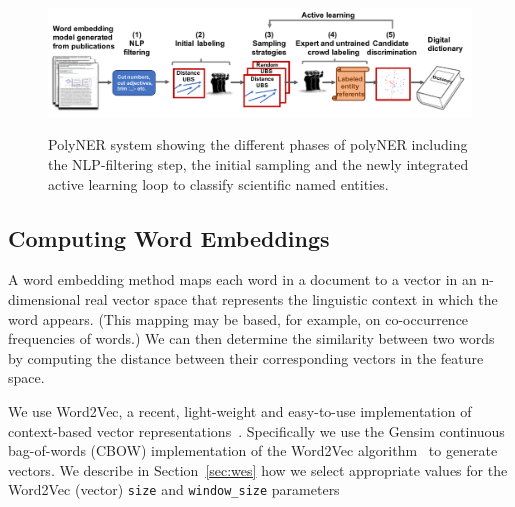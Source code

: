 \begin{figure}[!t]
{\includegraphics[width=\textwidth]{figures/architecture.pdf}}
\caption{\label{fig:architecture} PolyNER system showing the different phases of polyNER including the NLP-filtering step, the initial sampling and the newly integrated active learning loop to classify scientific named entities. 
}
\end{figure}

\subsection{Computing Word Embeddings}\label{sec:wordembeddings}

A word embedding method 
maps each word
in a document to a vector in an n-dimensional real vector space that
represents the linguistic context in which the word appears. (This mapping may
be based, for example, on co-occurrence frequencies of words.) 
We can then
determine the similarity between two words by computing the distance between
their corresponding vectors in the feature space.

We use Word2Vec, a recent, light-weight and easy-to-use implementation of context-based vector representations~\cite{mikolov2013efficient,mikolov2013distributed}.
Specifically we use the Gensim continuous bag-of-words
(CBOW) implementation of the Word2Vec
algorithm~\cite{rehurek2010software} to generate vectors.
We describe in Section~\ref{sec:wes} how we select appropriate values for the
Word2Vec (vector) \texttt{size} and \texttt{window_size} parameters


